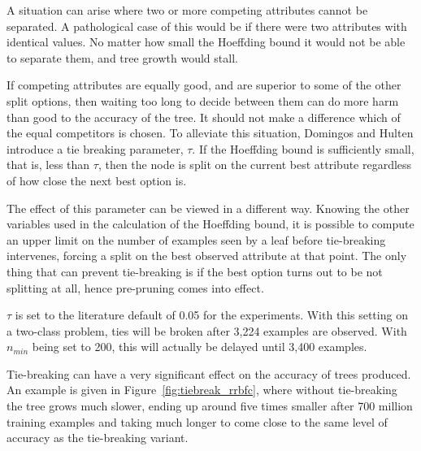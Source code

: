 A situation can arise where two or more competing attributes cannot be separated. A pathological case of this would be if there were two attributes with identical values. No matter how small the Hoeffding bound it would not be able to separate them, and tree growth would stall.

If competing attributes are equally good, and are superior to some of the other split options, then waiting too long to decide between them can do more harm than good to the accuracy of the tree. It should not make a difference which of the equal competitors is chosen. To alleviate this situation, Domingos and Hulten introduce a tie breaking parameter, $\tau$. If the Hoeffding bound is sufficiently small, that is, less than $\tau$, then the node is split on the current best attribute regardless of how close the next best option is.

The effect of this parameter can be viewed in a different way. Knowing the other variables used in the calculation of the Hoeffding bound, it is possible to compute an upper limit on the number of examples seen by a leaf before tie-breaking intervenes, forcing a split on the best observed attribute at that point. The only thing that can prevent tie-breaking is if the best option turns out to be not splitting at all, hence pre-pruning comes into effect.

$\tau$ is set to the literature default of 0.05 for the experiments. With this setting on a two-class problem, ties will be broken after 3,224 examples are observed. With $n_{min}$ being set to 200, this will actually be delayed until 3,400 examples.

Tie-breaking can have a very significant effect on the accuracy of trees produced. An example is given in Figure~\ref{fig:tiebreak_rrbfc}, where without tie-breaking the tree grows much slower, ending up around five times smaller after 700 million training examples and taking much longer to come close to the same level of accuracy as the tie-breaking variant.

